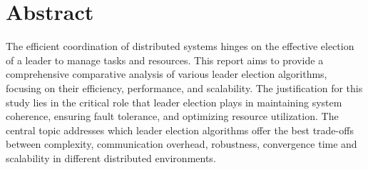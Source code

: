 \chapter*{Abstract}


The efficient coordination of distributed systems hinges on the effective election of a leader to manage tasks and resources. This report aims to provide a comprehensive comparative analysis of various leader election algorithms, focusing on their efficiency, performance, and scalability. The justification for this study lies in the critical role that leader election plays in maintaining system coherence, ensuring fault tolerance, and optimizing resource utilization. The central topic addresses which leader election algorithms offer the best trade-offs between complexity, communication overhead, robustness, convergence time and scalability in different distributed environments.

